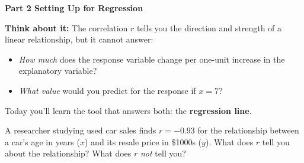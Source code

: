 \documentclass[10pt]{article}
\begin{document}
\vspace{0.28in}

{\large\bfseries\color{navy} Part 2 \quad Setting Up for Regression}

\vspace{0.12in}

\begin{tcolorbox}[colback=greenbg, colframe=greenacc, boxrule=0.8pt, arc=2mm,
    left=4mm, right=4mm, top=3mm, bottom=3mm]
    \small
    \textbf{Think about it:} The correlation $r$ tells you the direction and strength of a
    linear relationship, but it cannot answer:
    \begin{itemize}[leftmargin=1.3em, itemsep=3pt]
      \item \emph{How much} does the response variable change per one-unit increase in the
            explanatory variable?
      \item \emph{What value} would you predict for the response if $x = 7$?
    \end{itemize}
    Today you'll learn the tool that answers both: the \textbf{regression line}.
\end{tcolorbox}

\vspace{0.14in}

\noindent A researcher studying used car sales finds $r = -0.93$ for the relationship between a
car's age in years ($x$) and its resale price in \$1000s ($y$). What does $r$ tell you about the
relationship? What does $r$ \emph{not} tell you?\\[8pt]
\writeline\\[2pt]\writeline\\[2pt]\writeline
\end{document}
